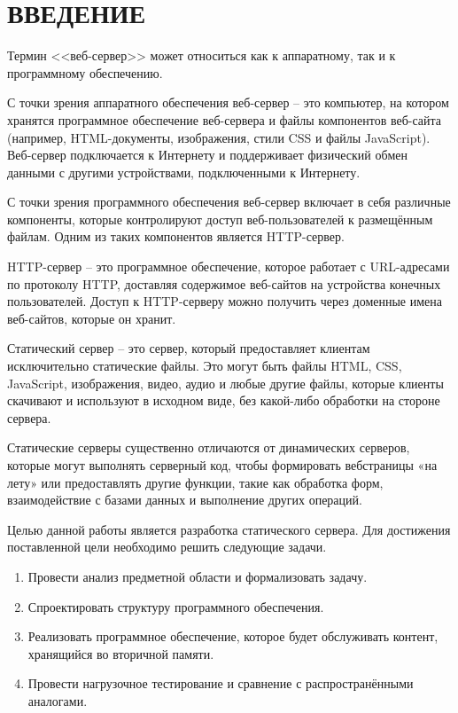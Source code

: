 \section*{ВВЕДЕНИЕ}

Термин <<веб-сервер>>  может относиться как к аппаратному, так и к
программному обеспечению.

С точки зрения аппаратного обеспечения веб-сервер -- это компьютер,
на котором хранятся программное обеспечение веб-сервера и файлы компонентов веб-сайта (например, HTML-документы, изображения, стили CSS и файлы
JavaScript). Веб-сервер подключается к Интернету и поддерживает физический
обмен данными с другими устройствами, подключенными к Интернету. 

С точки зрения программного обеспечения веб-сервер включает в себя
различные компоненты, которые контролируют доступ веб-пользователей к размещённым файлам. Одним из таких компонентов является HTTP-сервер.

HTTP-сервер -- это программное обеспечение, которое работает
с URL-адресами по протоколу HTTP, доставляя содержимое веб-сайтов на
устройства конечных пользователей. Доступ к HTTP-серверу можно получить
через доменные имена веб-сайтов, которые он хранит.

Статический сервер -- это сервер, который предоставляет клиентам
исключительно статические файлы. Это могут быть файлы HTML, CSS,
JavaScript, изображения, видео, аудио и любые другие файлы, которые клиенты
скачивают и используют в исходном виде, без какой-либо обработки на стороне
сервера. 

Статические серверы существенно отличаются от динамических серверов, которые могут выполнять серверный код, чтобы формировать вебстраницы «на лету» или предоставлять другие функции, такие как обработка
форм, взаимодействие с базами данных и выполнение других операций. 

Целью данной работы является разработка статического сервера. Для достижения поставленной цели необходимо решить следующие задачи.

\begin{enumerate}[leftmargin=1.6\parindent]
	\item Провести анализ предметной области и формализовать задачу.
	
	\item Спроектировать структуру программного обеспечения.
	
	\item Реализовать программное обеспечение, которое будет обслуживать контент,
	хранящийся во вторичной памяти.
	
	\item Провести нагрузочное тестирование и сравнение с распространёнными аналогами.
\end{enumerate}

\pagebreak

